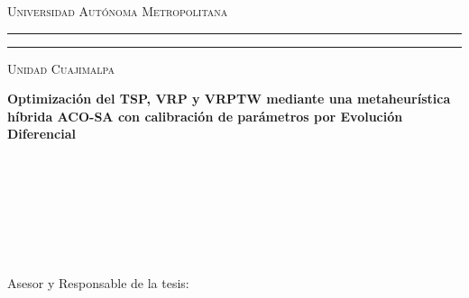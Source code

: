 \documentclass[12pt,titlepage,twoside,openright]{book}
\begin{document}

\thispagestyle{empty}

\hskip-1.5cm

\begin{minipage}[c][9.5cm][s]{10cm}
	\begin{center}
		{\Large \scshape Universidad Autónoma Metropolitana}
		\vspace{0.3cm}
		\hrule height2pt
		\vspace{0.1cm}
		\hrule height1pt
		\vspace{0.3cm}
		{\scshape Unidad Cuajimalpa}

		\vspace{2cm}

		{\large \textbf{Optimización del TSP, VRP y VRPTW mediante una metaheurística híbrida ACO-SA con calibración de parámetros por Evolución Diferencial}}

		\vspace{2cm}
		\\[8pt]

		\\[3pt]
		\elnombre\\[0.5cm]

		{\textsc{\large \lacarrera}}\\[3pt]
		\\[13pt]
		\\[13pt]

		\vspace{2cm}

		{Asesor y Responsable de la tesis:\\ \eldirector}

		\vspace{2cm}
		\begin{flushright}
			\lafecha
		\end{flushright}

	\end{center}
\end{minipage}
\end{document}
